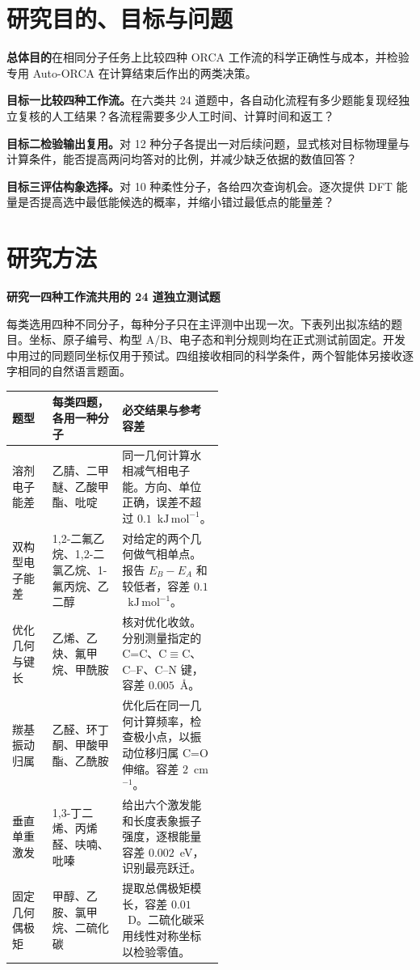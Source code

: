 \documentclass[12pt,a4paper]{article}
\newcommand{\subhead}[1]{\par\addvspace{0.4em}\textbf{#1}\par\nobreak}
\newcommand{\kJmol}{\ensuremath{\mathrm{kJ\,mol^{-1}}}}
\begin{document}
\section{研究目的、目标与问题}
\textbf{总体目的}\quad 在相同分子任务上比较四种 ORCA 工作流的科学正确性与成本，并检验专用 Auto-ORCA 在计算结束后作出的两类决策。

\textbf{目标一\quad 比较四种工作流。}在六类共 24 道题中，各自动化流程有多少题能复现经独立复核的人工结果？各流程需要多少人工时间、计算时间和返工？

\textbf{目标二\quad 检验输出复用。}对 12 种分子各提出一对后续问题，显式核对目标物理量与计算条件，能否提高两问均答对的比例，并减少缺乏依据的数值回答？

\textbf{目标三\quad 评估构象选择。}对 10 种柔性分子，各给四次查询机会。逐次提供 DFT 能量是否提高选中最低能候选的概率，并缩小错过最低点的能量差？

\clearpage
\section{研究方法}
\subhead{研究一\quad 四种工作流共用的 24 道独立测试题}
每类选用四种不同分子，每种分子只在主评测中出现一次。下表列出拟冻结的题目。坐标、原子编号、构型 A/B、电子态和判分规则均在正式测试前固定。开发中用过的同题同坐标仅用于预试。四组接收相同的科学条件，两个智能体另接收逐字相同的自然语言题面。

\begin{tabularx}{\linewidth}{@{}P{0.19\linewidth}P{0.33\linewidth}Y@{}}
\toprule
\textbf{题型} & \textbf{每类四题，各用一种分子} & \textbf{必交结果与参考容差} \\
\midrule
溶剂电子能差 & 乙腈、二甲醚、乙酸甲酯、吡啶 & 同一几何计算水相减气相电子能。方向、单位正确，误差不超过 $0.1$~\kJmol{}。\\
双构型电子能差 & 1,2-二氟乙烷、1,2-二氯乙烷、1-氟丙烷、乙二醇 & 对给定的两个几何做气相单点。报告 $E_B-E_A$ 和较低者，容差 $0.1$~\kJmol{}。\\
优化几何与键长 & 乙烯、乙炔、氟甲烷、甲酰胺 & 核对优化收敛。分别测量指定的 C=C、C$\equiv$C、C--F、C--N 键，容差 $0.005$~\AA。\\
羰基振动归属 & 乙醛、环丁酮、甲酸甲酯、乙酰胺 & 优化后在同一几何计算频率，检查极小点，以振动位移归属 C=O 伸缩。容差 $2$~cm$^{-1}$。\\
垂直单重激发 & 1,3-丁二烯、丙烯醛、呋喃、吡嗪 & 给出六个激发能和长度表象振子强度，逐根能量容差 $0.002$~eV，识别最亮跃迁。\\
固定几何偶极矩 & 甲醇、乙胺、氯甲烷、二硫化碳 & 提取总偶极矩模长，容差 $0.01$~D。二硫化碳采用线性对称坐标以检验零值。\\
\bottomrule
\end{tabularx}
\end{document}
